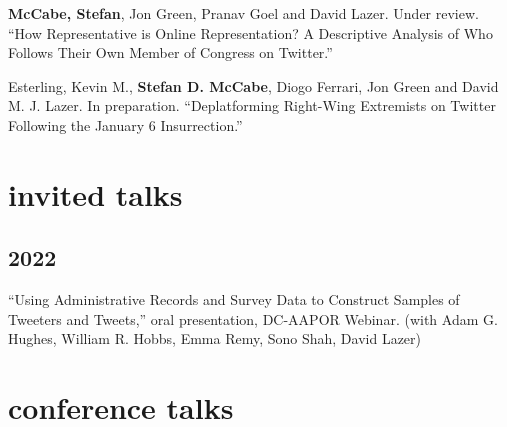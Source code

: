 \documentclass[11pt, letter]{article}
\begin{document}
\begin{hangparas}{.25in}{1}

\textbf{McCabe, Stefan}, Jon Green, Pranav Goel and David Lazer. Under review. ``How Representative is Online Representation? A Descriptive Analysis of Who Follows Their Own Member of Congress on Twitter.''\vspace{2mm}

Esterling, Kevin M.,\textsuperscript{\textdagger} \textbf{Stefan D. McCabe},\textsuperscript{\textdagger} Diogo Ferrari, Jon Green and David M. J. Lazer. In preparation. ``Deplatforming Right-Wing Extremists on Twitter Following the January 6 Insurrection.''\vspace{2mm}




\end{hangparas}

\section{invited talks}
\subsection{2022}
\begin{hangparas}{.25in}{1}
``Using Administrative Records and Survey Data to Construct Samples of Tweeters and Tweets,'' oral presentation, DC-AAPOR Webinar. (with Adam G. Hughes, William R. Hobbs, Emma Remy, Sono Shah, David Lazer) \vspace{2mm}
\end{hangparas}

\vspace{2mm}
\section{conference talks}
\end{document}
